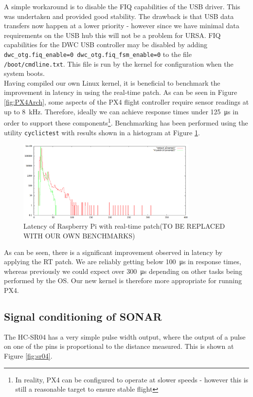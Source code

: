 \documentclass[capstone_report.tex]{subfiles}
\begin{document}
    A simple workaround is to disable the FIQ capabilities of the USB driver. This was undertaken and provided good stability. The drawback is that USB data transfers now happen at a lower priority - however since we have minimal data requirements on the USB hub this will not be a problem for URSA. FIQ capabilities for the DWC USB controller may be disabled by adding \texttt{dwc\_otg.fiq\_enable=0 dwc\_otg.fiq\_fsm\_enable=0} to the file \texttt{/boot/cmdline.txt}. This file is run by the kernel for configuration when the system boots.\\

    Having compiled our own Linux kernel, it is beneficial to benchmark the improvement in latency in using the real-time patch. As can be seen in Figure \ref{fig:PX4Arch}, some aspects of the PX4 flight controller require sensor readings at up to \SI{8}{\kilo\hertz}. Therefore, ideally we can achieve response times under \SI{125}{\micro\second} in order to support these components\footnote{In reality, PX4 can be configured to operate at slower speeds - however this is still a reasonable target to ensure stable flight}. Benchmarking has been performed using the utility \texttt{cyclictest} with results shown in a histogram at Figure \ref{fig:RT_bench}.

    \begin{figure}[H]
        \centering
        \includegraphics[width=0.8\textwidth]{imgs/rpi2-cyclictest-plot.png}
        \caption{Latency of Raspberry Pi with real-time patch(TO BE REPLACED WITH OUR OWN BENCHMARKS)\label{fig:RT_bench}}
    \end{figure}

    As can be seen, there is a significant improvement observed in latency by applying the RT patch. We are reliably getting below \SI{100}{\micro\second} in response times, whereas previously we could expect over \SI{300}{\micro\second} depending on other tasks being performed by the OS. Our new kernel is therefore more appropriate for running PX4.

    \subsection{Signal conditioning of SONAR}
 	The HC-SR04 has a very simple pulse width output, where the output of a pulse on one of the pins is proportional to the distance measured. This is shown at Figure \ref{fig:sr04}.
\end{document}
